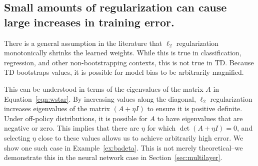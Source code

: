 \subsection{Small amounts of regularization can cause large increases in training error. }

There is a general assumption in the literature that $\ell_2$ regularization monotonically shrinks the learned weights. While this is true in classification, regression, and other non-bootstrapping contexts, this is not true in TD. Because TD bootstraps values, it is possible for model bias to be arbitrarily magnified.

This can be understood in terms of the eigenvalues of the matrix $A$ in Equation~\ref{eqn:wstar}. By increasing values along the diagonal, $\ell_2$ regularization increases eigenvalues of the matrix $(A + \eta I)$ to ensure it is positive definite. Under off-policy distributions, it is possible for $A$ to have eigenvalues that are negative or zero. This implies that there are $\eta$ for which $\det(A+\eta I) = 0$, and selecting $\eta$ close to these values allows us to achieve arbitrarily high error. We show one such case in Example~\ref{ex:badeta}. This is not merely theoretical--we demonstrate this in the neural network case in Section~\ref{sec:multilayer}.


